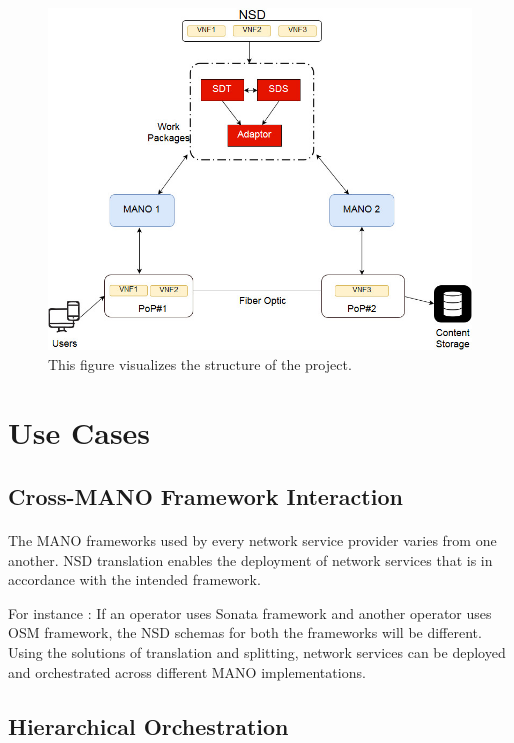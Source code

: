 \paragraph{}


\begin{figure}
	\centering
	\includegraphics[width=0.7\linewidth]{figures/Structure_Updated1}
	\caption{This figure visualizes the structure of the project. }
	\label{fig:structureupdated1}
\end{figure}


\newpage
\section{Use Cases}

\subsection{Cross-MANO Framework Interaction}
\paragraph{}

The MANO frameworks used by every network service provider varies from one another. NSD translation enables the deployment of network services that is in accordance with the intended framework.

For instance : If an operator uses Sonata framework and another operator uses OSM framework, the NSD schemas for both the frameworks will be different. Using the solutions of translation and splitting, network services can be deployed and orchestrated across different MANO implementations.

\subsection{Hierarchical Orchestration}
